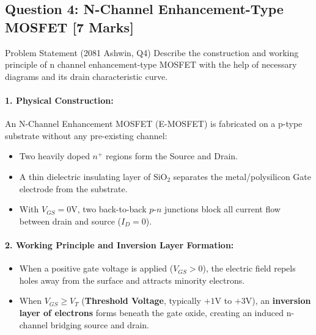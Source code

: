 \documentclass[11pt,a4paper,oneside]{book}
\begin{document}
\subsection{Question 4: N-Channel Enhancement-Type MOSFET [7 Marks]}
\begin{questionbox}{Problem Statement (2081 Ashwin, Q4)}
Describe the construction and working principle of n channel enhancement-type MOSFET with the help of necessary diagrams and its drain characteristic curve.
\end{questionbox}

\paragraph{1. Physical Construction:}
An N-Channel Enhancement MOSFET (E-MOSFET) is fabricated on a p-type substrate without any pre-existing channel:
\begin{itemize}[leftmargin=1.5em]
  \item Two heavily doped $n^+$ regions form the Source and Drain.
  \item A thin dielectric insulating layer of $\text{SiO}_2$ separates the metal/polysilicon Gate electrode from the substrate.
  \item With $V_{GS} = 0\text{V}$, two back-to-back $p$-$n$ junctions block all current flow between drain and source ($I_D = 0$).
\end{itemize}

\paragraph{2. Working Principle and Inversion Layer Formation:}
\begin{itemize}[leftmargin=1.5em]
  \item When a positive gate voltage is applied ($V_{GS} > 0$), the electric field repels holes away from the surface and attracts minority electrons.
  \item When $V_{GS} \ge V_T$ (\textbf{Threshold Voltage}, typically $+1\text{V}$ to $+3\text{V}$), an \textbf{inversion layer of electrons} forms beneath the gate oxide, creating an induced n-channel bridging source and drain.
\end{itemize}
\end{document}
